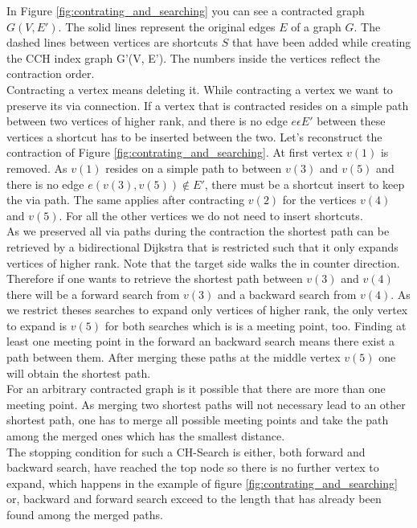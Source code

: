 In Figure \ref{fig:contrating_and_searching} you can see a contracted graph $G(V,E')$. The solid lines represent the original edges $E$ of a graph $G$. The dashed lines between vertices are shortcuts $S$ that 
have been added while creating the CCH index graph G'(V, E'). The numbers inside the vertices reflect the contraction order.
\\
Contracting a vertex means deleting it. While contracting a vertex we want to preserve its via connection. If a vertex that is contracted resides on a simple path between two vertices of higher rank,
and there is no edge $e \epsilon E'$ between these vertices a shortcut has to be inserted between the two. 
Let's reconstruct the contraction of Figure \ref{fig:contrating_and_searching}. At first vertex $v(1)$ is removed. As $v(1)$ resides on a simple path to between $v(3)$ and $v(5)$ and there is no edge $e(v(3), v(5)) \notin E'$,
there must be a shortcut insert to keep the via path.
The same applies after contracting $v(2)$ for the vertices $v(4)$ and $v(5)$. For all the other vertices we do not need to insert shortcuts.
\\
As we preserved all via paths during the contraction the shortest path can be retrieved by a bidirectional Dijkstra that is restricted such that it only expands vertices of higher rank. 
Note that the target side walks the in counter direction. 
Therefore if one wants to retrieve the shortest path between $v(3)$ and $v(4)$ there will be a forward search from $v(3)$ and a backward search from $v(4)$. As we restrict theses searches to expand only vertices
of higher rank, the only vertex to expand is $v(5)$ for both searches which is is a meeting point, too. Finding at least one meeting point in the forward an backward search means there exist a path between them.
After merging these paths at the middle vertex $v(5)$ one will obtain the shortest path.
\\
For an arbitrary contracted graph is it possible that there are more than one meeting point. As merging two shortest paths will not necessary lead to an other shortest path, one has to merge
all possible meeting points and take the path among the merged ones which has the smallest distance. 
\\ 
The stopping condition for such a CH-Search is either, both forward and backward search, have reached the top node so there is no further vertex to expand, which happens in the example of figure \ref{fig:contrating_and_searching} or, backward and forward search exceed to 
the length that has already been found among the merged paths.

